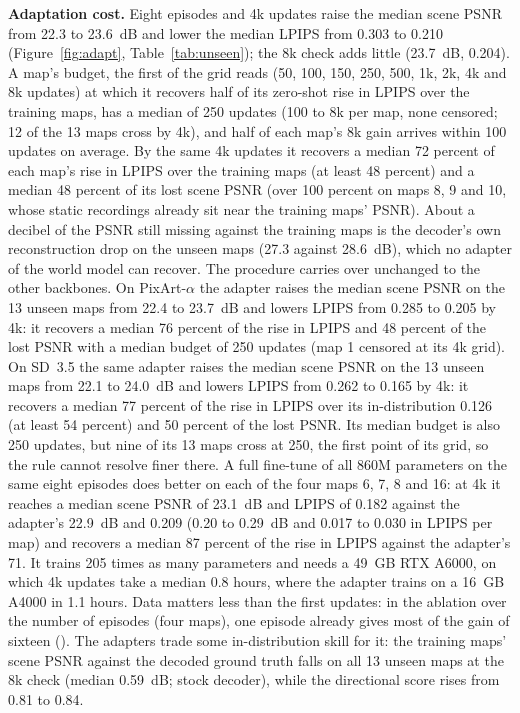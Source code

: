 \textbf{Adaptation cost.}
Eight episodes and 4k updates raise the median scene PSNR from 22.3 to 23.6~dB and lower the median LPIPS from 0.303 to 0.210 (Figure~\ref{fig:adapt}, Table~\ref{tab:unseen}); the 8k check adds little (23.7~dB, 0.204).
A map's budget, the first of the grid reads (50, 100, 150, 250, 500, 1k, 2k, 4k and 8k updates) at which it recovers half of its zero-shot rise in LPIPS over the training maps, has a median of 250 updates (100 to 8k per map, none censored; 12 of the 13 maps cross by 4k), and half of each map's 8k gain arrives within 100 updates on average.
By the same 4k updates it recovers a median 72 percent of each map's rise in LPIPS over the training maps (at least 48 percent) and a median 48 percent of its lost scene PSNR (over 100 percent on maps 8, 9 and 10, whose static recordings already sit near the training maps' PSNR).
About a decibel of the PSNR still missing against the training maps is the decoder's own reconstruction drop on the unseen maps (27.3 against 28.6~dB), which no adapter of the world model can recover.
The procedure carries over unchanged to the other backbones.
On PixArt-$\alpha$ the adapter raises the median scene PSNR on the 13 unseen maps from 22.4 to 23.7~dB and lowers LPIPS from 0.285 to 0.205 by 4k: it recovers a median 76 percent of the rise in LPIPS and 48 percent of the lost PSNR with a median budget of 250 updates (map 1 censored at its 4k grid).
On SD~3.5 the same adapter raises the median scene PSNR on the 13 unseen maps from 22.1 to 24.0~dB and lowers LPIPS from 0.262 to 0.165 by 4k: it recovers a median 77 percent of the rise in LPIPS over its in-distribution 0.126 (at least 54 percent) and 50 percent of the lost PSNR.
Its median budget is also 250 updates, but nine of its 13 maps cross at 250, the first point of its grid, so the rule cannot resolve finer there.
A full fine-tune of all 860M parameters on the same eight episodes does better on each of the four maps 6, 7, 8 and 16: at 4k it reaches a median scene PSNR of 23.1~dB and LPIPS of 0.182 against the adapter's 22.9~dB and 0.209 (0.20 to 0.29~dB and 0.017 to 0.030 in LPIPS per map) and recovers a median 87 percent of the rise in LPIPS against the adapter's 71. It trains 205 times as many parameters and needs a 49~GB RTX A6000, on which 4k updates take a median 0.8 hours, where the adapter trains on a 16~GB A4000 in 1.1 hours.
Data matters less than the first updates: in the ablation over the number of episodes (four maps), one episode already gives most of the gain of sixteen ().
The adapters trade some in-distribution skill for it: the training maps' scene PSNR against the decoded ground truth falls on all 13 unseen maps at the 8k check (median 0.59~dB; stock decoder), while the directional score rises from 0.81 to 0.84.
